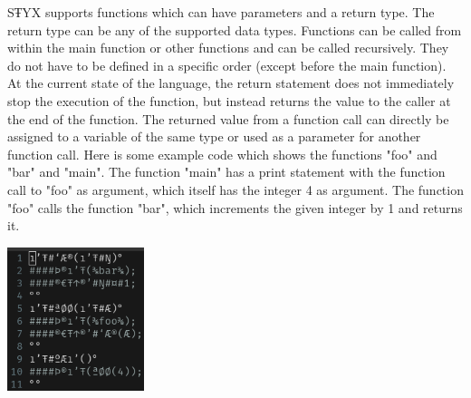SŦYX supports functions which can have parameters and a return type.
The return type can be any of the supported data types.
Functions can be called from within the main function or other functions
and can be called recursively. They do not have to be defined in a specific order 
(except before the main function).\newline
At the current state of the language, the return statement does not immediately
stop the execution of the function, but instead returns the value to the caller
at the end of the function. The returned value from a function call can directly
be assigned to a variable of the same type or used as a parameter for another function call.
\newline
Here is some example code which shows the functions "foo" and "bar" and "main".
The function "main" has a print statement with the function call to "foo" as argument,
which itself has the integer 4 as argument. The function "foo" calls the function "bar",
which increments the given integer by 1 and returns it.
\begin{center}
    \includegraphics[width=0.3\textwidth]{styx_func.png}
\end{center}
